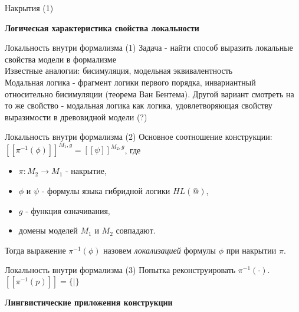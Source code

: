 \documentclass{beamer}
\begin{document}
\begin{frame}{Накрытия (1)}
\end{frame}



\begin{frame}{}
\begin{center}
	\textbf{Логическая характеристика свойства локальности}
\end{center}
\end{frame}

\begin{frame}{Локальность внутри формализма (1)}
Задача - найти способ выразить локальные свойства модели в формализме\\
Известные аналогии: бисимуляция, модельная эквивалентность\\
Модальная логика - фрагмент логики первого порядка, инвариантный относительно бисимуляции (теорема Ван Бентема).
Другой вариант смотреть на то же свойство - модальная логика как логика, удовлетворяющая свойству выразимости в древовидной модели (?)
\end{frame}

\begin{frame}{Локальность внутри формализма (2)}
Основное соотношение конструкции:\\
\bigskip
$[ \! [ \pi^{-1}(\phi) ] \! ]^{M_1, g} = [ \! [ \psi ] \! ]^{M_2, g}$, где\\
\bigskip
\begin{itemize}
	\item $\pi : M_2 \to M_1$ - накрытие,
	\item $\phi$ и $\psi$ - формулы языка гибридной логики $HL(@)$,
	\item $g$ - функция означивания,
	\item домены моделей $M_1$ и $M_2$ совпадают.
\end{itemize}
\bigskip
Тогда выражение $\pi^{-1}(\phi)$ назовем \textit{локализацией} формулы $\phi$ при накрытии $\pi$.
\end{frame}

\begin{frame}{Локальность внутри формализма (3)}
Попытка реконструировать $\pi^{-1}( \cdot )$.\\
$[ \! [ \pi^{-1}(p) ] \! ] = \{   \vert \}$
\end{frame}


\begin{frame}{}
\begin{center}
	\textbf{Лингвистические приложения конструкции}
\end{center}
\end{frame}
\end{document}
